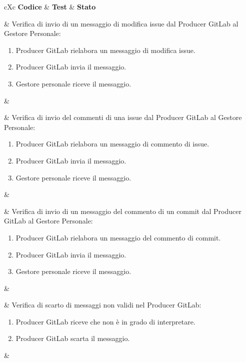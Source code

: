 \begin{table}[H]
	\begin{VTtable}[1.7]{\textwidth}{cXc}
		\rowcolor{\tablegray}
		\textbf{Codice} & \centering\textbf{Test} & \textbf{Stato} \\\toprule

         \addtotv & Verifica di invio di un messaggio di modifica issue dal Producer GitLab al Gestore Personale:
        \begin{enumerate}
            \item Producer GitLab rielabora un messaggio di modifica issue.
            \item Producer GitLab invia il messaggio.
            \item Gestore personale riceve il messaggio.
        \end{enumerate}
        & \TNI \\\midrule

        \addtotv & Verifica di invio del commenti di una issue dal Producer GitLab al Gestore Personale:
        \begin{enumerate}
            \item Producer GitLab rielabora un messaggio di commento di issue.
            \item Producer GitLab invia il messaggio.
            \item Gestore personale riceve il messaggio.
        \end{enumerate}
        & \TNI \\\midrule

        \addtotv & Verifica di invio di un messaggio del commento di un commit dal Producer GitLab al Gestore Personale:
        \begin{enumerate}
            \item Producer GitLab rielabora un messaggio del commento di commit.
            \item Producer GitLab invia il messaggio.
            \item Gestore personale riceve il messaggio.
        \end{enumerate}
        & \TNI \\\midrule

        \addtotv & Verifica di scarto di messaggi non validi nel Producer GitLab:
        \begin{enumerate}
            \item Producer GitLab riceve che non è in grado di interpretare.
            \item Producer GitLab scarta il messaggio.
        \end{enumerate}
        & \TNI \\\midrule


\end{VTtable}
\end{table}

